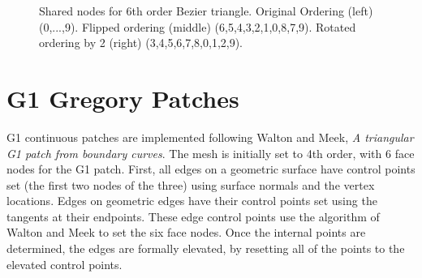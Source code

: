 \documentclass{article}
\begin{document}
\begin{figure}[!ht]
\hspace{0.5cm}
\hspace{0.5cm}
\caption{Shared nodes for 6th order Bezier triangle. Original Ordering (left) (0,...,9). Flipped ordering (middle) (6,5,4,3,2,1,0,8,7,9). Rotated ordering by 2 (right) (3,4,5,6,7,8,0,1,2,9).}
\end{figure}

\section{G1 Gregory Patches}
G1 continuous patches are implemented following Walton and Meek, \textit{A triangular G1 patch from boundary curves}. The mesh is initially set to 4th order, with 6 face nodes for the G1 patch. First, all edges on a geometric surface have control points set (the first two nodes of the three) using surface normals and the vertex locations. Edges on geometric edges have their control points set using the tangents at their endpoints. These edge control points use the algorithm of Walton and Meek to set the six face nodes. Once the internal points are determined, the edges are formally elevated, by resetting all of the points to the elevated control points.
\end{document}
